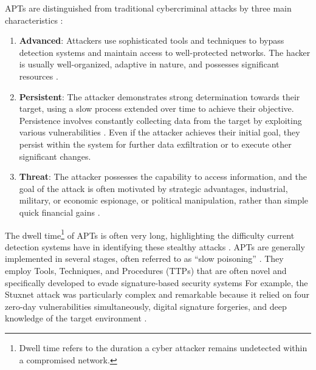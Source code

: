 APTs are distinguished from traditional cybercriminal attacks by three main characteristics \cite{krishnapriya2024comprehensive,singh2016comprehensive}:
\begin{enumerate}
    \item \textbf{Advanced}: Attackers use sophisticated tools and techniques to bypass detection systems and maintain access to well-protected networks. The hacker is usually well-organized, adaptive in nature, and possesses significant resources \cite{singh2016comprehensive}.
    \item \textbf{Persistent}: The attacker demonstrates strong determination towards their target, using a slow process extended over time to achieve their objective. Persistence involves constantly collecting data from the target by exploiting various vulnerabilities \cite{krishnapriya2024comprehensive}. Even if the attacker achieves their initial goal, they persist within the system for further data exfiltration or to execute other significant changes.
    \item \textbf{Threat}: The attacker possesses the capability to access information, and the goal of the attack is often motivated by strategic advantages, industrial, military, or economic espionage, or political manipulation, rather than simple quick financial gains \cite{singh2016comprehensive}.
\end{enumerate}


The dwell time\footnote{Dwell time refers to the duration a cyber attacker remains undetected within a compromised network.} of APTs is often very long, highlighting the difficulty current detection systems have in identifying these stealthy attacks \cite{krishnapriya2024comprehensive}. APTs are generally implemented in several stages, often referred to as ``slow poisoning'' \cite{krishnapriya2024comprehensive}. They employ Tools, Techniques, and Procedures (TTPs) that are often novel and specifically developed to evade signature-based security systems For example, the Stuxnet attack was particularly complex and remarkable because it relied on four zero-day vulnerabilities simultaneously, digital signature forgeries, and deep knowledge of the target environment \cite{singh2016comprehensive}.


